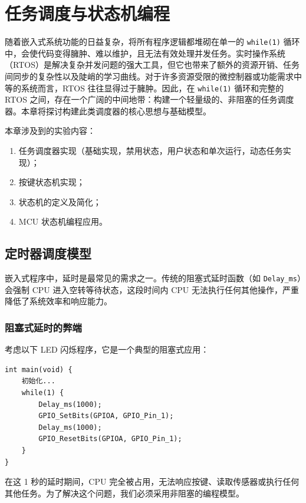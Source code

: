 \chapter{任务调度与状态机编程} \label{ch:scheduler-and-state-machine}

随着嵌入式系统功能的日益复杂，将所有程序逻辑都堆砌在单一的 \texttt{while(1)} 循环中，会使代码变得臃肿、难以维护，且无法有效处理并发任务。实时操作系统（RTOS）是解决复杂并发问题的强大工具，但它也带来了额外的资源开销、任务间同步的复杂性以及陡峭的学习曲线。对于许多资源受限的微控制器或功能需求中等的系统而言，RTOS 往往显得过于臃肿。因此，在 \texttt{while(1)} 循环和完整的 RTOS 之间，存在一个广阔的中间地带：构建一个轻量级的、非阻塞的任务调度器。本章将探讨构建此类调度器的核心思想与基础模型。

\medskip 本章涉及到的实验内容：
\begin{enumerate}
\item 任务调度器实现（基础实现，禁用状态，用户状态和单次运行，动态任务实现）；
\item 按键状态机实现；
\item 状态机的定义及简化；
\item MCU 状态机编程应用。
\end{enumerate}

\section{定时器调度模型}

嵌入式程序中，延时是最常见的需求之一。传统的阻塞式延时函数（如 \texttt{Delay\_ms}）会强制 CPU 进入空转等待状态，这段时间内 CPU 无法执行任何其他操作，严重降低了系统效率和响应能力。

\subsection{阻塞式延时的弊端}

考虑以下 LED 闪烁程序，它是一个典型的阻塞式应用：

\begin{lstlisting}[style=c]
int main(void) {
    初始化...
    while(1) {
        Delay_ms(1000);
        GPIO_SetBits(GPIOA, GPIO_Pin_1);
        Delay_ms(1000);
        GPIO_ResetBits(GPIOA, GPIO_Pin_1);
    }
}
\end{lstlisting}

在这 1 秒的延时期间，CPU 完全被占用，无法响应按键、读取传感器或执行任何其他任务。为了解决这个问题，我们必须采用非阻塞的编程模型。

